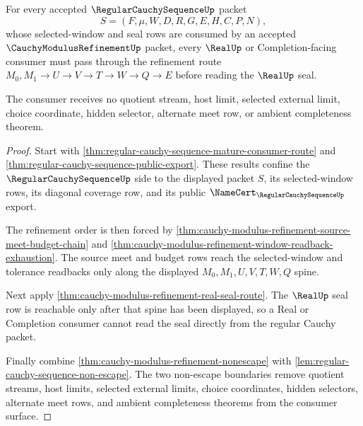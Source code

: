 \begin{theorem}
\label{thm:regular-cauchy-sequence-modulus-refinement-consumer-lock}
For every accepted $\RegularCauchySequenceUp$ packet
$$
S=(F,\mu,W,D,R,G,E,H,C,P,N),
$$
whose selected-window and seal rows are consumed by an accepted $\CauchyModulusRefinementUp$ packet, every $\RealUp$ or Completion-facing consumer must pass through the refinement route $M_0,M_1 \to U \to V \to T \to W \to Q \to E$ before reading the $\RealUp$ seal.

The consumer receives no quotient stream, host limit, selected external limit, choice coordinate, hidden selector, alternate meet row, or ambient completeness theorem.
\end{theorem}
\begin{proof}
Start with \autoref{thm:regular-cauchy-sequence-mature-consumer-route} and \autoref{thm:regular-cauchy-sequence-public-export}. These results confine the $\RegularCauchySequenceUp$ side to the displayed packet $S$, its selected-window rows, its diagonal coverage row, and its public $\NameCert_{\RegularCauchySequenceUp}$ export.

The refinement order is then forced by \autoref{thm:cauchy-modulus-refinement-source-meet-budget-chain} and \autoref{thm:cauchy-modulus-refinement-window-readback-exhaustion}. The source meet and budget rows reach the selected-window and tolerance readbacks only along the displayed $M_0,M_1,U,V,T,W,Q$ spine.

Next apply \autoref{thm:cauchy-modulus-refinement-real-seal-route}. The $\RealUp$ seal row is reachable only after that spine has been displayed, so a Real or Completion consumer cannot read the seal directly from the regular Cauchy packet.

Finally combine \autoref{thm:cauchy-modulus-refinement-nonescape} with \autoref{lem:regular-cauchy-sequence-non-escape}. The two non-escape boundaries remove quotient streams, host limits, selected external limits, choice coordinates, hidden selectors, alternate meet rows, and ambient completeness theorems from the consumer surface.
\end{proof}

